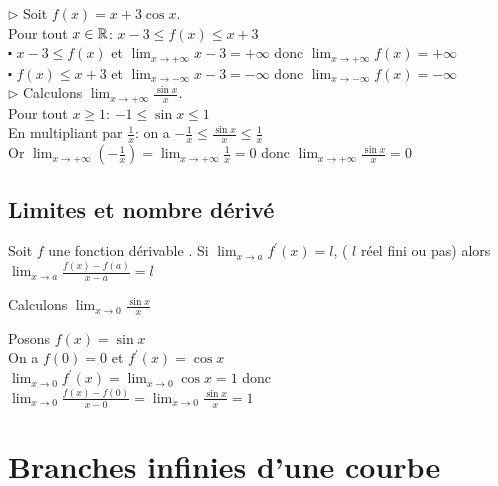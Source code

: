 \begin{example}
$\triangleright $ Soit $ f(x)= x+ 3\cos x $.\\
Pour tout $x\in\mathbb{R}$: \quad $ x-3\leq f(x)\leq x+3 $ \\
$ \centerdot $ $ x-3\leq f(x)$ et $\displaystyle \lim_{x \to +\infty}x-3=+\infty  $ donc $ \displaystyle \lim_{x \to +\infty}f(x)=+\infty $\\
$ \centerdot $ $  f(x)\leq x+3$ et $\displaystyle \lim_{x \to -\infty}x-3=-\infty  $ donc $ \displaystyle \lim_{x \to -\infty}f(x)=-\infty $ \\

$ \triangleright $ Calculons $\displaystyle\lim_{x \to +\infty}\frac{\sin x}{x} $.\\

Pour tout $ x\geq 1 $: $ -1\leq\sin x \leq 1 $ \\
En multipliant par $ \frac{1}{x} $: on a $ -\frac{1}{x}\leq \frac{\sin x}{x} \leq\frac{1}{x} $\\
Or $\displaystyle\lim_{x \to +\infty}(-\frac{1}{x})= \displaystyle\lim_{x \to +\infty}\frac{1}{x}=0$ donc $\displaystyle\lim_{x \to +\infty}\frac{\sin x}{x}=0 $
\end{example}


\subsection{Limites et nombre dérivé}

\begin{theorem}
Soit $ f $ une fonction dérivable .
Si $\displaystyle \lim_{x \to a}f^{'}(x)=l$,\;  ( $l$ réel fini ou pas) alors $\displaystyle\lim_{x \to a} \frac{f(x)-f(a)}{x-a}=l$
\end{theorem}

\begin{example}
Calculons $\displaystyle\lim_{x \to 0}\frac{\sin x}{x} $

Posons $ f(x)=\sin x $\\
On a $ f(0)=0 $ et  $ f^{'}(x)=\cos x$\\
 $ \displaystyle\lim_{x \to 0}f^{'}(x)=\displaystyle\lim_{x \to 0}\cos x=1 $ donc $\displaystyle \lim_{x \to 0} \frac{f(x)-f(0)}{x-0}=\displaystyle \lim_{x \to 0}\frac{\sin x}{x}=1$
\end{example}

\section{Branches infinies d'une courbe}

